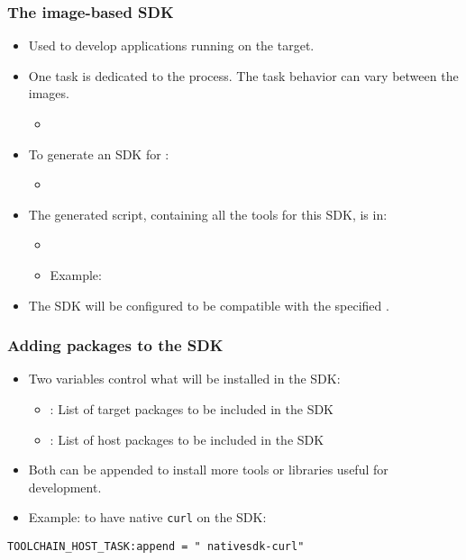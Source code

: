 \begin{frame}
  \frametitle{The image-based SDK}
  \begin{itemize}
    \item Used to develop applications running on the target.
    \item One task is dedicated to the process. The task behavior
      can vary between the images.
      \begin{itemize}
        \item {}
      \end{itemize}
    \item To generate an SDK for :
      \begin{itemize}
        \item {}
      \end{itemize}
    \item The generated script, containing all the tools for this SDK,
      is in:
      \begin{itemize}
        \item {}
        \item Example:
      \end{itemize}
    \item The SDK will be configured to be compatible with the
      specified .
  \end{itemize}
\end{frame}

\begin{frame}[fragile]
  \frametitle{Adding packages to the SDK}
  \begin{itemize}
    \item Two variables control what will be installed in the SDK:
    \begin{itemize}
      \item {}:
        List of target packages to be included in the SDK
      \item {}:
        List of host packages to be included in the SDK
    \end{itemize}
    \item Both can be appended to install more tools or libraries useful
      for development.
    \item Example: to have native {\tt curl} on the SDK:
  \end{itemize}
  \begin{block}{}
    \fontsize{9}{9}\selectfont
    \begin{verbatim}
TOOLCHAIN_HOST_TASK:append = " nativesdk-curl"
    \end{verbatim}
  \end{block}
\end{frame}

